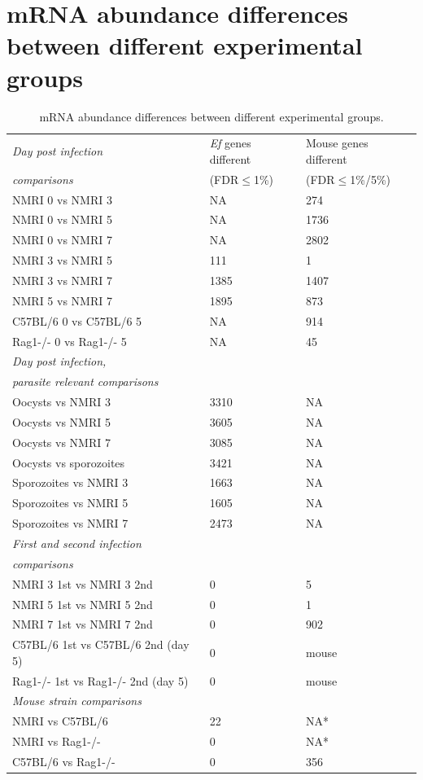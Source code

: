 \documentclass{bmcart}
\begin{document}
\section{mRNA abundance differences between different experimental groups}
\setlength{\tabcolsep}{8pt}
\begin{table}[H]
\small
\begin{center}
\caption{mRNA abundance differences between different experimental groups.}
\begin{tabular}{*3l}    \toprule
\textit{Day post infection} & \textit{Ef} genes different & Mouse genes different \\ 
	\textit{comparisons} 	    & (FDR$\leq$1\%) &  (FDR$\leq$1\%/5\%) \\ \midrule
	NMRI 0 vs NMRI 3		& NA   & 274 \\
	NMRI 0 vs NMRI 5		& NA   & 1736 \\
	NMRI 0 vs NMRI 7		& NA   & 2802 \\
	NMRI 3 vs NMRI 5     		& 111  & 1 \\
	NMRI 3 vs NMRI 7  		& 1385 & 1407 \\ 
	NMRI 5 vs NMRI 7  		& 1895 & 873 \\ 
	C57BL/6 0 vs C57BL/6 5		& NA	& 914 \\
	Rag1-/- 0 vs Rag1-/- 5		& NA	& 45 \\ \midrule
\textit{Day post infection,} & 		 & 		 \\ 
\textit{parasite relevant comparisons} 	    & 		&  \\ \midrule
	Oocysts vs NMRI 3  	& 3310 & NA \\  
	Oocysts vs NMRI 5	& 3605 & NA \\ 
	Oocysts vs NMRI 7	& 3085 & NA \\ 
	Oocysts vs sporozoites  & 3421 & NA \\
	Sporozoites vs NMRI 3 	& 1663 & NA \\
	Sporozoites vs NMRI 5 	& 1605 & NA \\
	Sporozoites vs NMRI 7 	& 2473 & NA \\ \midrule
\textit{First and second infection} & 		 & 	 \\ 
\textit{comparisons} 	    & 		& 	\\ \midrule
	NMRI 3 1st vs NMRI 3 2nd  	& 0  & 5 \\
	NMRI 5 1st vs NMRI 5 2nd  	& 0  & 1 \\
	NMRI 7 1st vs NMRI 7 2nd  	& 0  & 902 \\
	C57BL/6 1st vs C57BL/6 2nd (day 5) & 0 &  mouse \\
	Rag1-/- 1st vs Rag1-/- 2nd (day 5) & 0 & mouse  \\ \midrule
\textit{Mouse strain comparisons} & 		 & 	 \\ \midrule
	NMRI vs C57BL/6 		& 22 	& NA* \\		
	NMRI vs Rag1-/-     		& 0 & NA* 	\\
	C57BL/6 vs Rag1-/-  		& 0   & 356 	\\ \midrule
\bottomrule
	\hline
\end{tabular}
\end{center}
\end{table}
\end{document}
